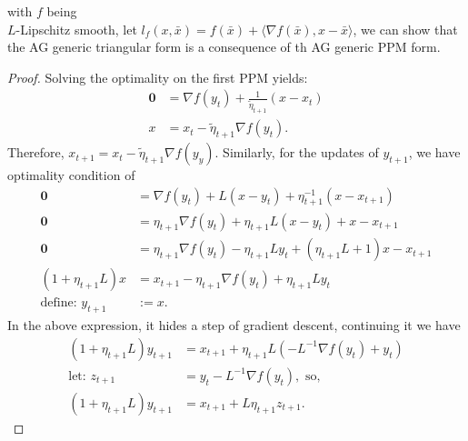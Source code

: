         \begin{proposition}
            \label{prop:tri_form_via_ppm}
            with $f$ being \\
            $L$-Lipschitz smooth, 
            let $l_f(x, \bar x) = f(\bar x) + \langle \nabla f(\bar x), x - \bar x\rangle$, we can show that the AG generic triangular form is a consequence of th AG generic PPM form. 
        \end{proposition}
        \begin{proof}
            Solving the optimality on the first PPM yields: 
            \begin{align*}
                \mathbf 0 &= \nabla f(y_t) + 
                \frac{1}{\tilde \eta_{t + 1}} (x - x_t)
                \\
                x &= x_t - \tilde \eta_{t + 1} \nabla f(y_t).
            \end{align*}
            Therefore, $x_{t + 1} = x_t - \tilde \eta_{t + 1}\nabla f(y_y)$. 
            Similarly, for the updates of $y_{t + 1}$, we have optimality condition of 
            \begin{align*}
                \mathbf 0 &= \nabla f (y_t) + L (x - y_t) + \eta_{t + 1}^{-1} (x - x_{t + 1})
                \\
                \mathbf 0 &= \eta_{t + 1}\nabla f (y_t) + \eta_{t + 1}L (x - y_t) + x - x_{t + 1}
                \\
                \mathbf 0 &= 
                \eta_{t + 1}\nabla f(y_t) -\eta_{t + 1} Ly_t + (\eta_{t + 1}L + 1)x - x_{t + 1}
                \\
                (1 + \eta_{t + 1}L)x
                &= 
                x_{t + 1} - \eta_{t + 1}\nabla f(y_t) + \eta_{t + 1}L y_t
                \\
                \text{define: } y_{t + 1} &:= x. 
            \end{align*}
            In the above expression, it hides a step of gradient descent, continuing it we have 
            \begin{align*}
                (1 + \eta_{t + 1}L)y_{t + 1} &= 
                x_{t + 1}  + \eta_{t + 1}L (-L^{-1}\nabla f(y_t) + y_t)
                \\
                \text{let: } z_{t + 1} &= y_t - L^{-1}\nabla f(y_t), \text{ so, }
                \\
                (1 + \eta_{t + 1}L)y_{t + 1} &= 
                x_{t + 1} + L\eta_{t + 1}z_{t + 1}. 

\end{align*}
\end{proof}
